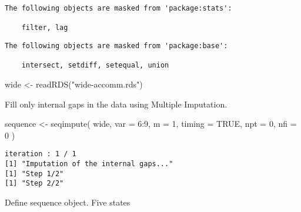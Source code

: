 \documentclass[
  letterpaper,
  DIV=11,
  numbers=noendperiod]{scrreprt}
\newenvironment{Shaded}{\begin{snugshade}}{\end{snugshade}}
\newcommand{\AttributeTok}[1]{\textcolor[rgb]{0.40,0.45,0.13}{#1}}
\newcommand{\ConstantTok}[1]{\textcolor[rgb]{0.56,0.35,0.01}{#1}}
\newcommand{\DecValTok}[1]{\textcolor[rgb]{0.68,0.00,0.00}{#1}}
\newcommand{\FunctionTok}[1]{\textcolor[rgb]{0.28,0.35,0.67}{#1}}
\newcommand{\NormalTok}[1]{\textcolor[rgb]{0.00,0.23,0.31}{#1}}
\newcommand{\OtherTok}[1]{\textcolor[rgb]{0.00,0.23,0.31}{#1}}
\newcommand{\SpecialCharTok}[1]{\textcolor[rgb]{0.37,0.37,0.37}{#1}}
\newcommand{\StringTok}[1]{\textcolor[rgb]{0.13,0.47,0.30}{#1}}
\begin{document}
\begin{verbatim}
The following objects are masked from 'package:stats':

    filter, lag
\end{verbatim}

\begin{verbatim}
The following objects are masked from 'package:base':

    intersect, setdiff, setequal, union
\end{verbatim}

\begin{Shaded}
\begin{Highlighting}[]
\NormalTok{wide }\OtherTok{\textless{}{-}} \FunctionTok{readRDS}\NormalTok{(}\StringTok{"wide{-}accomm.rds"}\NormalTok{)}
\end{Highlighting}
\end{Shaded}

Fill only internal gaps in the data using Multiple Imputation.

\begin{Shaded}
\begin{Highlighting}[]
\NormalTok{sequence }\OtherTok{\textless{}{-}} \FunctionTok{seqimpute}\NormalTok{(}
\NormalTok{  wide, }\AttributeTok{var =} \DecValTok{6}\SpecialCharTok{:}\DecValTok{9}\NormalTok{, }\AttributeTok{m =} \DecValTok{1}\NormalTok{, }\AttributeTok{timing =} \ConstantTok{TRUE}\NormalTok{,}
  \AttributeTok{npt =} \DecValTok{0}\NormalTok{, }\AttributeTok{nfi =} \DecValTok{0}
\NormalTok{)}
\end{Highlighting}
\end{Shaded}

\begin{verbatim}
iteration : 1 / 1 
[1] "Imputation of the internal gaps..."
[1] "Step 1/2"
[1] "Step 2/2"
\end{verbatim}

Define sequence object. Five states
\end{document}
